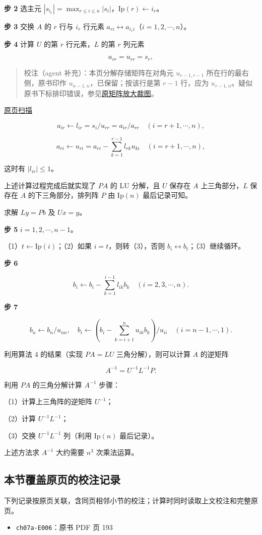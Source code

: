 \documentclass[
  10pt,
  fontset=fandol]{ctexart}
\providecommand{\tightlist}{%
  \setlength{\itemsep}{0pt}\setlength{\parskip}{0pt}}
\begin{document}
\textbf{步 2} 选主元 \(|s_{i_r}|=\max_{r\le i\le n}|s_i|\)，\(\mathrm{Ip}(r)\leftarrow i_r\)。

\textbf{步 3} 交换 \(A\) 的 \(r\) 行与 \(i_r\) 行元素 \(a_{ri}\leftrightarrow a_{i_ri}\)（\(i=1,2,\cdots,n\)）。

\textbf{步 4} 计算 \(U\) 的第 \(r\) 行元素，\(L\) 的第 \(r\) 列元素

\[a_{rr}=u_{rr}=s_r,\]

\begin{quote}
校注（agent 补充）：本页分解存储矩阵在对角元 \(u_{r-1,r-1}\) 所在行的最右侧，原书印作 \(u_{n-1,n}\)，已保留；按该行是第 \(r-1\) 行，应为 \(u_{r-1,n}\)。疑似原书下标排印错误，参见\href{../assets/ch07a/pdf-193-storage-detail.png}{原矩阵放大裁图}。
\end{quote}

\href{../../source-images/pdf-194.jpeg}{原页扫描}

\[a_{ir}\leftarrow l_{ir}=s_i/u_{rr}=a_{ir}/a_{rr}\quad(i=r+1,\cdots,n),\]

\[a_{ri}\leftarrow u_{ri}=a_{ri}-\sum_{k=1}^{r-1}l_{rk}u_{ki}\quad(i=r+1,\cdots,n),\]

这时有 \(|l_{ir}|\le1\)。

上述计算过程完成后就实现了 \(PA\) 的 LU 分解，且 \(U\) 保存在 \(A\) 上三角部分，\(L\) 保存在 \(A\) 的下三角部分，排列阵 \(P\) 由 \(\mathrm{Ip}(n)\) 最后记录可知。

求解 \(Ly=Pb\) 及 \(Ux=y\)。

\textbf{步 5} \(i=1,2,\cdots,n-1\)。

（1）\(t\leftarrow\mathrm{Ip}(i)\)；（2）如果 \(i=t\)，则转（3），否则 \(b_i\leftrightarrow b_t\)；（3）继续循环。

\textbf{步 6}

\[b_i\leftarrow b_i-\sum_{k=1}^{i-1}l_{ik}b_k\quad(i=2,3,\cdots,n).\]

\textbf{步 7}

\[b_n\leftarrow b_n/u_{nn},\quad b_i\leftarrow\left(b_i-\sum_{k=i+1}^{n}u_{ik}b_k\right)/u_{ii}\quad(i=n-1,\cdots,1).\]

利用算法 4 的结果（实现 \(PA=LU\) 三角分解），则可以计算 \(A\) 的逆矩阵

\[A^{-1}=U^{-1}L^{-1}P.\]

利用 \(PA\) 的三角分解计算 \(A^{-1}\) 步骤：

（1）计算上三角阵的逆矩阵 \(U^{-1}\)；

（2）计算 \(U^{-1}L^{-1}\)；

（3）交换 \(U^{-1}L^{-1}\) 列（利用 \(\mathrm{Ip}(n)\) 最后记录）。

上述方法求 \(A^{-1}\) 大约需要 \(n^3\) 次乘法运算。

\subsection{本节覆盖原页的校注记录}\label{ux672cux8282ux8986ux76d6ux539fux9875ux7684ux6821ux6ce8ux8bb0ux5f55}

下列记录按原页关联，含同页相邻小节的校注；计算时同时读取上文校注和完整原页。

\begin{itemize}
\tightlist
\item
  \texttt{ch07a-E006}：原书 PDF 页 193
\end{itemize}
\end{document}
